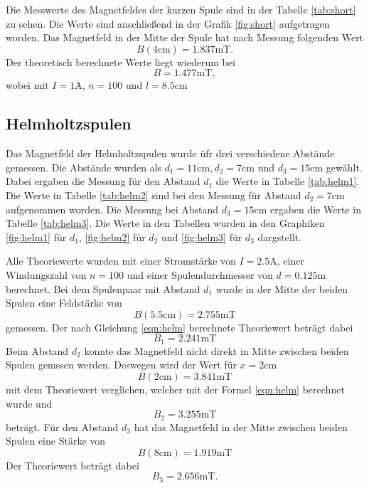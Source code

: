 Die Messwerte des Magnetfeldes der kurzen Spule sind in der Tabelle \ref{tab:short} zu sehen.
Die Werte sind anschließend in der Grafik \ref{fig:short} aufgetragen worden.
Das Magnetfeld in der Mitte der Spule hat nach Messung folgenden Wert
\begin{equation*}
  B(4\si{\centi\meter})=1.837\si{\milli\tesla} .
\end{equation*}
Der theoretisch berechnete Werte liegt wiederum bei
\begin{equation*}
  B = 1.477\si{\milli\tesla},
\end{equation*}
wobei mit $I=1\si{\ampere}$, $n=100$ und $l=8.5 \si{\centi\meter}$
\FloatBarrier

\subsection{Helmholtzspulen}

Das Magnetfeld der Helmholtzspulen wurde üfr drei verschiedene Abstände gemessen.
Die Abstände wurden als $d_1=11\si{\centi\metre}, d_2=7\si{\centi\metre}$ und $d_3= 15 \si{\centi\metre}$ gewählt.
Dabei ergaben die Messung für den Abstand $d_1$ die Werte in Tabelle \ref{tab:helm1}.
Die Werte in Tabelle \ref{tab:helm2} sind bei den Messung für Abstand $d_2=7\si{\centi\metre}$ aufgenommen worden.
Die Messung bei Abstand $d_3=15\si{\centi\metre}$ ergaben die Werte in Tabelle \ref{tab:helm3}.
Die Werte in den Tabellen wurden in den Graphiken \ref{fig:helm1} für $d_1$, \ref{fig:helm2} für $d_2$ und \ref{fig:helm3} für $d_3$ dargstellt.

Alle Theoriewerte wurden mit einer Stromstärke von $I=2.5 \si{\ampere}$, einer Windungszahl von $n=100$ und einer Spulendurchmesser von $d=0.125\si{\meter}$ berechnet.
Bei dem Spulenpaar mit Abstand $d_1$ wurde in der Mitte der beiden Spulen eine Feldstärke von 
\begin{equation*}
  B(5.5\si{\centi\meter}) = 2.755 \si{\milli\tesla}
\end{equation*}
gemessen.
Der nach Gleichung \eqref{eqn:helm} berechnete Theoriewert beträgt dabei
\begin{equation*}
  B_1= 2.241 \si{\milli\tesla}
\end{equation*}
Beim Abstand $d_2$ konnte das Magnetfeld nicht direkt in Mitte zwischen beiden Spulen gemssen werden.
Deswegen wird der Wert für $x=2 \si{\centi\meter}$
\begin{equation*}
  B(2\si{\centi\meter})= 3.841 \si{\milli\tesla}
\end{equation*}
mit dem Theoriewert verglichen, welcher mit der Formel \eqref{eqn:helm} berechnet wurde und 
\begin{equation*}
  B_2 = 3.255 \si{\milli\tesla}
\end{equation*}
beträgt.
Für den Abstand $d_3$ hat das Magnetfeld in der Mitte zwischen beiden Spulen eine Stärke von 
\begin{equation*}
  B(8\si{\centi\meter})= 1.919\si{\milli\tesla}
\end{equation*}
Der Theoriewert beträgt dabei 
\begin{equation*}
  B_3=2.656 \si{\milli\tesla}.
\end{equation*}


